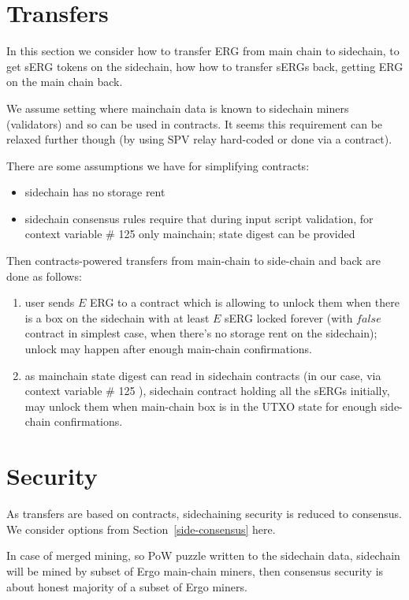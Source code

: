 \documentclass{article}   %
\begin{document}
\section{Transfers}

In this section we consider how to transfer ERG from main chain to sidechain, to get sERG tokens on the sidechain, how
how to transfer sERGs back, getting ERG on the main chain back.

We assume setting where mainchain data is known to sidechain miners (validators) and so can be used in contracts. It seems
this requirement can be relaxed further though (by using SPV relay hard-coded or done via a contract).

There are some assumptions we have for simplifying contracts:
\begin{itemize}
  \item sidechain has no storage rent
  \item sidechain consensus rules require that during input script validation, for context variable \# 125 only mainchain;
        state digest can be provided
\end{itemize}

Then contracts-powered transfers from main-chain to side-chain and back are done as follows:

\begin{enumerate}
  \item user sends $E$ ERG to a contract which is allowing to unlock them when there is a box on the sidechain with
  at least $E$ sERG locked forever (with ${false}$ contract in simplest case, when there's no storage rent on the sidechain);
  unlock may happen after enough main-chain confirmations.

  \item as mainchain state digest can read in sidechain contracts (in our case, via context variable \# 125 ), sidechain
  contract holding all the sERGs initially, may unlock them when main-chain box is in the UTXO state for enough
  side-chain confirmations.
\end{enumerate}

\section{Security}

As transfers are based on contracts, sidechaining security is reduced to consensus. We consider options
from Section~\ref{side-consensus} here.

In case of merged mining, so PoW puzzle written to the sidechain data, sidechain will be mined by subset of Ergo 
main-chain miners, then consensus security is about honest majority of a subset of Ergo miners. 
\end{document}
